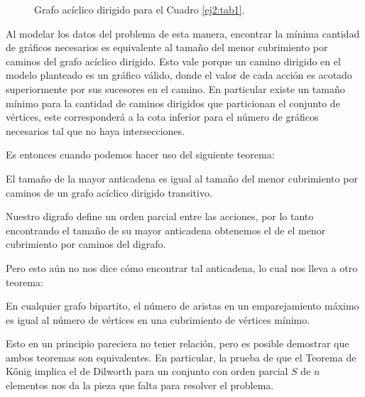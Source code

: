 \begin{figure}[H]
	\caption{Grafo acíclico dirigido para el Cuadro \ref{ej2:tab1}.} \label{ej2:fig1}
	\centering
\end{figure}

Al modelar los datos del problema de esta manera, encontrar la mínima cantidad
de gráficos necesarios es equivalente al tamaño del menor cubrimiento por caminos del
grafo acíclico dirigido. Esto vale porque un camino dirigido en el modelo
planteado es un gráfico válido, donde el valor de cada acción es acotado
superiormente por sus sucesores en el camino. En particular existe un tamaño
mínimo para la cantidad de caminos dirigidos que particionan el conjunto de vértices, este
corresponderá a la cota inferior para el número de gráficos necesarios tal que
no haya intersecciones.

Es entonces cuando podemos hacer uso del siguiente teorema:

\begin{theorem} \label{ej2:teo1}
	El tamaño de la mayor anticadena es igual al tamaño del menor cubrimiento
	por caminos de un grafo acíclico dirigido transitivo.
\end{theorem}

Nuestro digrafo define un orden parcial entre las acciones, por lo tanto
encontrando el tamaño de su mayor anticadena obtenemos el de el menor
cubrimiento por caminos del digrafo.

Pero esto aún no nos dice cómo encontrar tal anticadena, lo cual nos lleva a
otro teorema:

\begin{theorem} \label{ej2:teo2}
	En cualquier grafo bipartito, el número de aristas en un emparejamiento
	máximo es igual al número de vértices en una cubrimiento de vértices mínimo.
\end{theorem}

Esto en un principio pareciera no tener relación, pero es posible demostrar que
ambos teoremas son equivalentes. En particular, la prueba de que el Teorema de K\H{o}nig
implica el de Dilworth para un conjunto con orden parcial $S$ de $n$ elementos
nos da la pieza que falta para resolver el problema.

